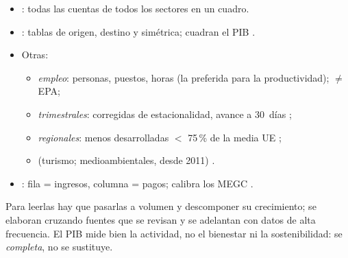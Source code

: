 \documentclass{article}
\begin{document}
\begin{columnas}
\begin{itemize}
\item {}: todas las cuentas de todos los sectores en un cuadro.
\item {}: tablas de origen, destino y simétrica; cuadran el PIB .
\item Otras:
  \begin{itemize}
  \item \emph{empleo}: personas, puestos, horas (la preferida para la productividad); $\neq$ EPA;
  \item \emph{trimestrales}: corregidas de estacionalidad, avance a 30~días ;
  \item \emph{regionales}: menos desarrolladas $<$ 75\,\% de la media UE ;
  \item {} (turismo; medioambientales, desde 2011) .
  \end{itemize}
\item {}: fila = ingresos, columna = pagos; calibra los MEGC .
\end{itemize}

\begin{ideaclave}
Para leerlas hay que pasarlas a volumen y descomponer su crecimiento; se elaboran cruzando fuentes que se revisan y se adelantan con datos de alta frecuencia. El PIB mide bien la actividad, no el bienestar ni la sostenibilidad: se \emph{completa}, no se sustituye.
\end{ideaclave}


\end{columnas}
\end{document}
